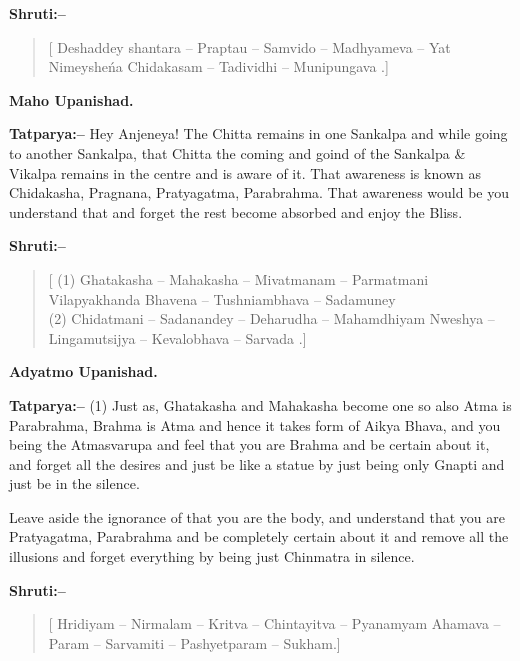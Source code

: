 \textbf{Shruti:–}

\begin{verse}
[ Deshaddey shantara – Praptau – Samvido – Madhyameva – Yat  Nimeysheńa Chidakasam – Tadividhi – Munipungava .]
\end{verse}

\begin{flushright}
\textbf{Maho Upanishad.}
\end{flushright}

\textbf{Tatparya:–} Hey Anjeneya! The Chitta remains in one Sankalpa and while going to another Sankalpa, that Chitta the coming and goind of the Sankalpa \& Vikalpa remains in the centre and is aware of it. That awareness is known as Chidakasha, Pragnana, Pratyagatma, Parabrahma. That awareness would be you understand that and forget the rest become absorbed and enjoy the Bliss.

\textbf{Shruti:–}

\begin{verse}
[ (1) Ghatakasha – Mahakasha – Mivatmanam – Parmatmani  Vilapyakhanda Bhavena – Tushniambhava – Sadamuney \\ (2) Chidatmani – Sadanandey – Deharudha – Mahamdhiyam  Nweshya – Lingamutsijya – Kevalobhava – Sarvada .]
\end{verse}

\begin{flushright}
\textbf{Adyatmo Upanishad.}
\end{flushright}

\textbf{Tatparya:–} (1) Just as, Ghatakasha and Mahakasha become one so also Atma is Parabrahma, Brahma is Atma and hence it takes form of Aikya Bhava, and you being the Atmasvarupa and feel that you are Brahma and be certain about it, and forget all the desires and just be like a statue by just being only Gnapti and just be in the silence.

Leave aside the ignorance of that you are the body, and understand that you are Pratyagatma, Parabrahma and be completely certain about it and remove all the illusions and forget everything by being just Chinmatra in silence.

\textbf{Shruti:–}

\begin{verse}
[ Hridiyam – Nirmalam – Kritva – Chintayitva – Pyanamyam  Ahamava – Param – Sarvamiti – Pashyetparam – Sukham.]
\end{verse}

